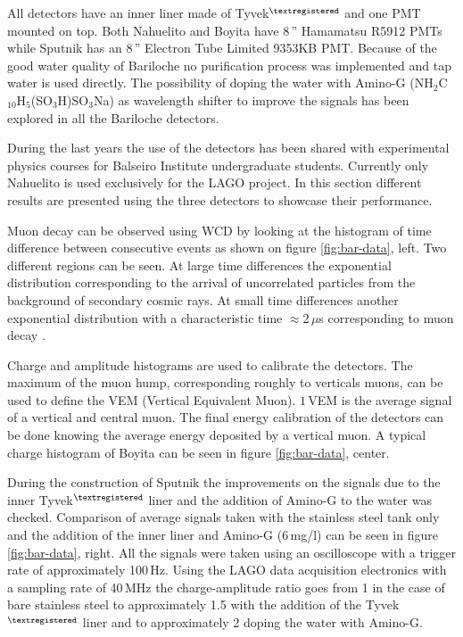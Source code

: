 All detectors have an inner liner made of Tyvek$^{\textregistered}$ and one PMT mounted on top.
Both Nahuelito and Boyita have 8\,'' Hamamatsu R5912 PMTs while Sputnik has an
8\,'' Electron Tube Limited 9353KB PMT. Because of the good water quality of Bariloche
no purification process was implemented and tap water is used directly. The possibility of
doping the water with Amino-G (NH$_2$C$_{10}$H$_5$(SO$_3$H)SO$_3$Na) as wavelength shifter
to improve the signals has been explored in all the Bariloche detectors. 
 

During the last years the use of the detectors has been shared with
experimental physics courses for Balseiro Institute undergraduate students.
Currently only Nahuelito is used exclusively for the LAGO project. In this
section different results are presented using the three detectors to showcase
their performance.

Muon decay can be observed using WCD by looking at the histogram of time
difference between consecutive events as shown on figure \ref{fig:bar-data},
left.  Two different regions can be seen. At large time differences the
exponential distribution corresponding to the arrival of uncorrelated particles
from the background of secondary cosmic rays. At small time differences another
exponential distribution with a characteristic time $\approx$2\,$\mu$s
corresponding to muon decay \cite{}.

Charge and amplitude histograms are used to calibrate the detectors. The
maximum of the muon hump, corresponding roughly to verticals muons, can be used
to define the VEM (Vertical Equivalent Muon). $1\,$VEM is the average signal of
a vertical and central muon. The final energy calibration of the detectors can
be done knowing the average energy deposited by a vertical muon. A typical
charge histogram of Boyita can be seen in figure \ref{fig:bar-data}, center.

During the construction of Sputnik the improvements on the signals due to the
inner Tyvek$^{\textregistered}$ liner and the addition of Amino-G to the water
was checked. Comparison of average signals taken with the stainless steel tank
only and the addition of the inner liner and Amino-G (6\,mg/l) can be seen in
figure \ref{fig:bar-data}, right. All the signals were taken using an oscilloscope
with a trigger rate of approximately 100\,Hz. Using the LAGO data acquisition
electronics with a sampling rate of 40\,MHz the charge-amplitude ratio goes
from 1 in the case of bare stainless steel to approximately 1.5 with the
addition of the Tyvek$^{\textregistered}$ liner and to approximately 2 doping
the water with Amino-G.  


